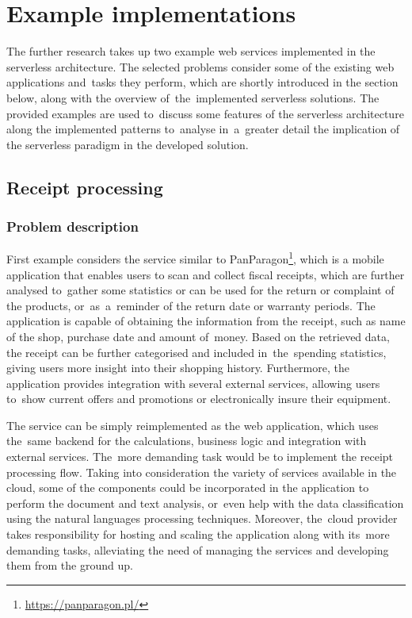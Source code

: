 \section{Example implementations} \label{chapter:example-implementations}

The further research takes up two example web services implemented in the serverless architecture.
The selected problems consider some of the existing web applications and~tasks they perform, which are shortly introduced in the section below, along with the overview of~the~implemented serverless solutions.
The provided examples are used to~discuss some features of the serverless architecture along the implemented patterns to~analyse in~a~greater detail the implication of the serverless paradigm in the developed solution.

\subsection{Receipt processing} \label{chapter:examples-receipt-processing}

\subsubsection{Problem description}

First example considers the service similar to PanParagon\footnote{\url{https://panparagon.pl/}}, which is a mobile application that enables users to scan and collect fiscal receipts, which are further analysed to~gather some statistics or can be used for the return or complaint of the products, or~as~a~reminder of the return date or warranty periods.
The application is capable of obtaining the information from the receipt, such as name of the shop, purchase date and amount of~money. Based on the retrieved data, the receipt can be further categorised and included in~the~spending statistics, giving users more insight into their shopping history. Furthermore, the application provides integration with several external services, allowing users to~show current offers and promotions or electronically insure their equipment.

The service can be simply reimplemented as the web application, which uses the~same backend for the calculations, business logic and integration with external services. The~more demanding task would be to implement the receipt processing flow. Taking into consideration the variety of services available in the cloud, some of the components could be incorporated in the application to perform the document and text analysis, or~even help with the data classification using the natural languages processing techniques. Moreover, the~cloud provider takes responsibility for hosting and scaling the application along with its~more demanding tasks, alleviating the need of managing the services and developing them from the ground up.

